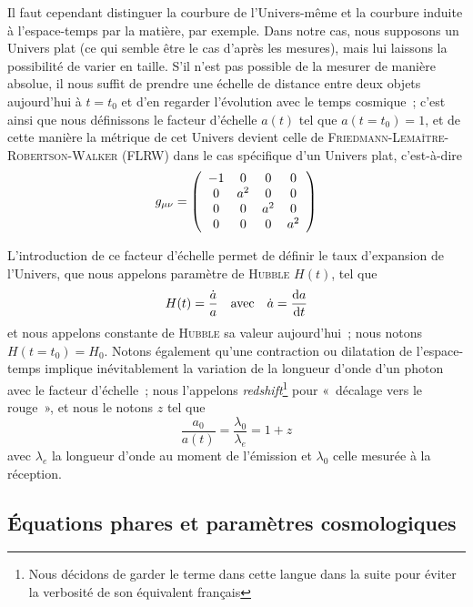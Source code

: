 \documentclass[../main/main.tex]{subfiles}
\begin{document}
Il faut cependant distinguer la courbure de l'Univers-même et la courbure
induite à l'espace-temps par la matière, par exemple. Dans notre cas, nous
supposons un Univers plat (ce qui semble être le cas d'après les mesures), mais
lui laissons la possibilité de varier en taille. S'il n'est pas possible de la
mesurer de manière absolue, il nous suffit de prendre une échelle de distance
entre deux objets aujourd'hui à $t = t_0$ et d'en regarder l'évolution avec le
temps cosmique~; c'est ainsi que nous définissons le facteur d'échelle $a(t)$
tel que $a(t=t_0) = 1$, et de cette manière la métrique de cet Univers devient
celle de \textsc{Friedmann}-\textsc{Lemaître}-\textsc{Robertson}-\textsc{Walker}
(FLRW) dans le cas spécifique d'un Univers plat, c'est-à-dire
\begin{equation}
    g_{\mu\nu} = \left(\begin{array}{c c c c}
            -1 & 0 & 0 & 0\\
            0 & a^2 & 0 & 0\\
            0 & 0 & a^2 & 0\\
            0 & 0 & 0 & a^2\\
    \end{array}\right)
\end{equation}

L'introduction de ce facteur d'échelle permet de définir le taux d'expansion de
l'Univers, que nous appelons paramètre de \textsc{Hubble} $H(t)$, tel que
\begin{equation}\label{eq:hz}
    H(t) = \frac{\dot{a}}{a}\quad\text{avec}\quad\dot{a} = \dv{a}{t}
\end{equation}
et nous appelons constante de \textsc{Hubble} sa valeur aujourd'hui~; nous
notons $H(t=t_0) = H_0$. Notons également qu'une contraction ou dilatation de
l'espace-temps implique inévitablement la variation de la longueur d'onde d'un
photon avec le facteur d'échelle~; nous l'appelons
\textit{redshift}\footnote{Nous décidons de garder le terme dans cette langue
dans la suite pour éviter la verbosité de son équivalent français} pour
«~décalage vers le rouge~», et nous le notons $z$ tel que
\begin{equation}\label{eq:z}
    \frac{a_0}{a(t)} = \frac{\lambda_0}{\lambda_e} = 1+z
\end{equation}
avec $\lambda_e$ la longueur d'onde au moment de l'émission et $\lambda_0$ celle
mesurée à la réception.

\subsection{Équations phares et paramètres cosmologiques}\label{ssec:rgeq}
\end{document}
